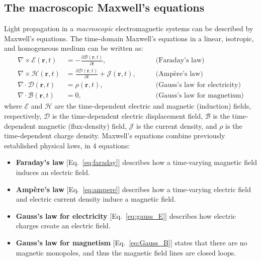 \subsection*{The macroscopic Maxwell's equations}

Light propagation in a \emph{macroscopic} electromagnetic systems can be
described by Maxwell's equations. The time-domain Maxwell's
equations in a linear, isotropic, and homogeneous medium can be written as:
\begin{align}
    \nabla \times \bm{\mathcal{E}} (\mathbf{r},t)            & = - \frac{\partial
    \bm{\mathcal{B}}(\mathbf{r},t)}{\partial t}, \quad \quad & \text{(Faraday's
    law)} \label{eq:faraday}                                                                                         \\
    \nabla \times \bm{\mathcal{H}} (\mathbf{r},t)            & = \frac{\partial
        \bm{\mathcal{D}}(\mathbf{r},t)}{\partial t} + \bm{\mathcal{J}}(\mathbf{r},t),
    \quad \quad                                              & \text{(Ampère's law)} \label{eq:ampere}               \\
    \nabla \cdot \bm{\mathcal{D}} (\mathbf{r},t)             & =
    \mathcal{\rho}(\mathbf{r},t), \quad \quad                & \text{(Gauss's law for electricity)}
    \label{eq:gauss_E}                                                                                               \\
    \nabla \cdot \bm{\mathcal{B}} (\mathbf{r},t)             & = 0, \quad \quad
                                                             & \text{(Gauss's law for magnetism)} \label{eq:Gauss_B}
\end{align}
where $\bm{\mathcal{E}}$ and $\bm{\mathcal{H}}$ are the time-dependent electric
and magnetic (induction) fields, respectively,
$\bm{\mathcal{D}}$ is the time-dependent electric displacement field,
$\bm{\mathcal{B}}$ is the time-dependent magnetic (flux-density) field,
$\bm{\mathcal{J}}$ is the current density,
and $\mathcal{\rho}$ is the time-dependent charge density. Maxwell's equations
combine previously established
physical laws, in 4 equations:
\begin{itemize}
    \item \textbf{Faraday's law} [Eq.~\eqref{eq:faraday}] describes how a
          time-varying magnetic field induces an electric field.
    \item \textbf{Ampère's law} [Eq.~\eqref{eq:ampere}] describes how a
          time-varying electric field and electric current density induce a magnetic
          field.
    \item \textbf{Gauss's law for electricity} [Eq.~\eqref{eq:gauss_E}]
          describes how electric charges create an electric field.
    \item \textbf{Gauss's law for magnetism} [Eq.~\eqref{eq:Gauss_B}] states
          that there are no magnetic monopoles, and thus the magnetic field lines are
          closed loops.
\end{itemize}

